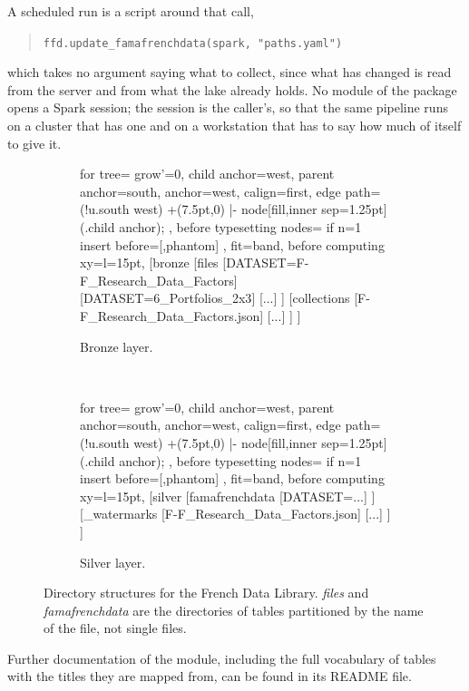 A scheduled run is a script around that call,
\begin{quote}
\verb|ffd.update_famafrenchdata(spark, "paths.yaml")|
\end{quote}
which takes no argument saying what to collect, since what has changed is read from the server and from what the lake already holds. No module of the package opens a Spark session; the session is the caller's, so that the same pipeline runs on a cluster that has one and on a workstation that has to say how much of itself to give it.

\begin{figure}[h!]
	\centering
	\begin{subfigure}[t]{.48\textwidth}
		\centering
		\begin{forest}
			for tree={
				grow'=0,
				child anchor=west,
				parent anchor=south,
				anchor=west,
				calign=first,
				edge path={
					\noexpand{}
					(!u.south west) +(7.5pt,0) |- node[fill,inner sep=1.25pt] {} (.child anchor);
				},
				before typesetting nodes={
					if n=1
					{insert before={[,phantom]}}
					{}
				},
				fit=band,
				before computing xy={l=15pt},
			}
			[bronze
				[files
					[{DATASET=F-F\_Research\_Data\_Factors}]
					[{DATASET=6\_Portfolios\_2x3}]
					[...]
				]
				[collections
					[F-F\_Research\_Data\_Factors.json]
					[...]
				]
			]
		\end{forest}
		\caption{Bronze layer.}
	\end{subfigure} %
	~
	\begin{subfigure}[t]{.48\textwidth}
		\centering
		\begin{forest}
			for tree={
				grow'=0,
				child anchor=west,
				parent anchor=south,
				anchor=west,
				calign=first,
				edge path={
					\noexpand{}
					(!u.south west) +(7.5pt,0) |- node[fill,inner sep=1.25pt] {} (.child anchor)\forestoption{edge label};
				},
				before typesetting nodes={
					if n=1
					{insert before={[,phantom]}}
					{}
				},
				fit=band,
				before computing xy={l=15pt},
			}
			[silver
				[famafrenchdata
					[{DATASET=...}]
				]
				[\_watermarks
					[F-F\_Research\_Data\_Factors.json]
					[...]
				]
			]
		\end{forest}
		\caption{Silver layer.}
	\end{subfigure}
	\caption{Directory structures for the French Data Library. \emph{files} and \emph{famafrenchdata} are the directories of tables partitioned by the name of the file, not single files.\label{fig:dirstruct_famafrenchdata}}
\end{figure}

Further documentation of the module, including the full vocabulary of tables with the titles they are mapped from, can be found in its README file.
